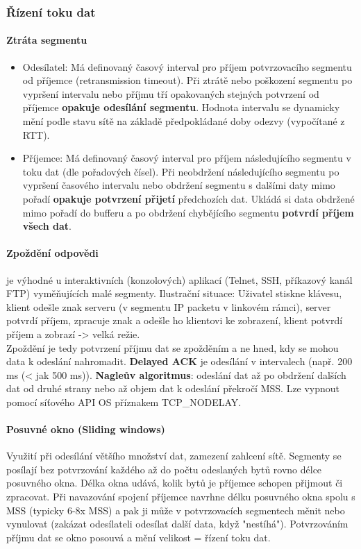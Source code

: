 \documentclass[10pt,a4paper]{article}
\begin{document}
\subsubsection{Řízení toku dat}
\paragraph{Ztráta segmentu}
\begin{itemize}
	\item Odesílatel: Má definovaný časový interval pro příjem potvrzovacího segmentu od příjemce (retransmission timeout). Při ztrátě nebo poškození segmentu po vypršení intervalu nebo příjmu tří opakovaných stejných potvrzení od příjemce \textbf{opakuje odesílání segmentu}. Hodnota intervalu se dynamicky mění podle stavu sítě na základě předpokládané doby odezvy (vypočítané z RTT).
	\item Příjemce: Má definovaný časový interval pro příjem následujícího segmentu v toku dat (dle pořadových čísel). Při neobdržení následujícího segmentu po vypršení časového intervalu nebo obdržení segmentu s dalšími daty mimo pořadí \textbf{opakuje potvrzení přijetí} předchozích dat. Ukládá si data obdržené mimo pořadí do bufferu a po obdržení chybějícího segmentu \textbf{potvrdí příjem všech dat}.
\end{itemize}
\paragraph{Zpoždění odpovědi} je výhodné u interaktivních (konzolových) aplikací (Telnet, SSH, příkazový kanál FTP) vyměňujících malé segmenty. Ilustrační situace: Uživatel stiskne klávesu, klient odešle znak serveru (v segmentu IP packetu v linkovém rámci), server potvrdí příjem, zpracuje znak a odešle ho klientovi ke zobrazení, klient potvrdí příjem a zobrazí -> velká režie. \\
Zpoždění je tedy potvrzení příjmu dat se zpožděním a ne hned, kdy se mohou data k odeslání nahromadit. \textbf{Delayed ACK} je odesílání v intervalech (např. 200 ms (< jak 500 ms)). \textbf{Nagleův algoritmus}: odeslání dat až po obdržení dalších dat od druhé strany nebo až objem dat k odeslání překročí MSS. Lze vypnout pomocí síťového API OS příznakem TCP\_NODELAY.
\paragraph{Posuvné okno (Sliding windows)} Využití při odesílání většího množství dat, zamezení zahlcení sítě. Segmenty se posílají bez potvrzování každého až do počtu odeslaných bytů rovno délce posuvného okna. Délka okna udává, kolik bytů je příjemce schopen přijmout či zpracovat. Při navazování spojení příjemce navrhne délku posuvného okna spolu s MSS (typicky 6-8x MSS) a pak ji může v potvrzovacích segmentech měnit nebo vynulovat (zakázat odesílateli odesílat další data, když "nestíhá"). Potvrzováním příjmu dat se okno posouvá a mění velikost = řízení toku dat.
\end{document}
